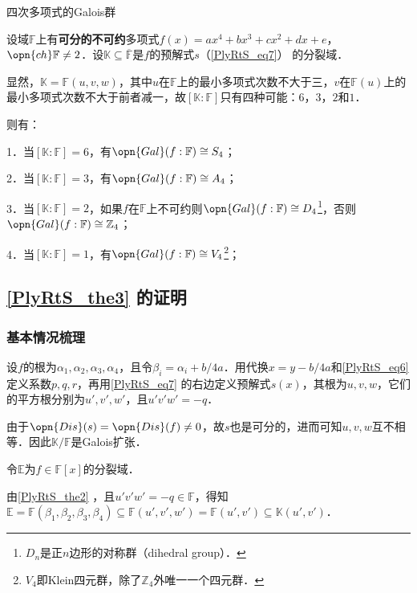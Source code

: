 \begin{theorem}{四次多项式的Galois群}\label{PlyRtS_the3}

设域$\mathbb{F}$上有\textbf{可分的不可约}多项式$f(x)=ax^4+bx^3+cx^2+dx+e$，$\opn{ch}\mathbb{F}\neq 2$．设$\mathbb{K}\subseteq\overline{\mathbb{F}}$是$f$的预解式$s$（\autoref{PlyRtS_eq7}） 的分裂域．

显然，$\mathbb{K}=\mathbb{F}(u, v, w)$，其中$u$在$\mathbb{F}$上的最小多项式次数不大于三，$v$在$\mathbb{F}(u)$上的最小多项式次数不大于前者减一，故$[\mathbb{K}:\mathbb{F}]$只有四种可能：$6$，$3$，$2$和$1$．

则有：

1．当$[\mathbb{K}:\mathbb{F}]=6$，有$\opn{Gal}(f:\mathbb{F})\cong S_4$；

2．当$[\mathbb{K}:\mathbb{F}]=3$，有$\opn{Gal}(f:\mathbb{F})\cong A_4$；

3．当$[\mathbb{K}:\mathbb{F}]=2$，如果$f$在$\mathbb{F}$上不可约则$\opn{Gal}(f:\mathbb{F})\cong D_4$\footnote{$D_n$是正$n$边形的对称群（dihedral group）．}，否则$\opn{Gal}(f:\mathbb{F})\cong \mathbb{Z}_4$；

4．当$[\mathbb{K}:\mathbb{F}]=1$，有$\opn{Gal}(f:\mathbb{F})\cong V_4$\footnote{$V_4$即Klein四元群，除了$\mathbb{Z}_4$外唯一一个四元群．}；

\end{theorem}

\subsection{\autoref{PlyRtS_the3} 的证明}

\subsubsection{基本情况梳理}

设$f$的根为$\alpha_1, \alpha_2, \alpha_3, \alpha_4$，且令$\beta_i=\alpha_i+b/4a$．用代换$x=y-b/4a$和\autoref{PlyRtS_eq6} 定义系数$p, q, r$，再用\autoref{PlyRtS_eq7} 的右边定义预解式$s(x)$，其根为$u, v, w$，它们的平方根分别为$u', v', w'$，且$u'v'w'=-q$．

由于$\opn{Dis}(s)=\opn{Dis}(f)\neq 0$，故$s$也是可分的，进而可知$u, v, w$互不相等．因此$\mathbb{K}/\mathbb{F}$是Galois扩张．

令$\mathbb{E}$为$f\in\mathbb{F}[x]$的分裂域．

由\autoref{PlyRtS_the2} ，且$u'v'w'=-q\in\mathbb{F}$，得知$\mathbb{E}=\mathbb{F}(\beta_1, \beta_2, \beta_3, \beta_4)\subseteq\mathbb{F}(u', v', w')=\mathbb{F}(u', v')\subseteq\mathbb{K}(u', v')$．

